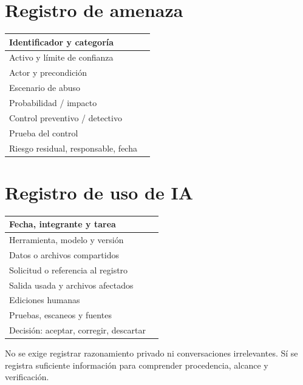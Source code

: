 \section{Registro de amenaza}

\begin{center}
\begin{tabularx}{0.94\textwidth}{p{3.3cm}X}
\toprule
Identificador y categoría & \\[0.45cm]\midrule
Activo y límite de confianza & \\[0.45cm]\midrule
Actor y precondición & \\[0.45cm]\midrule
Escenario de abuso & \\[0.45cm]\midrule
Probabilidad / impacto & \\[0.45cm]\midrule
Control preventivo / detectivo & \\[0.45cm]\midrule
Prueba del control & \\[0.45cm]\midrule
Riesgo residual, responsable, fecha & \\[0.45cm]
\bottomrule
\end{tabularx}
\end{center}

\section{Registro de uso de IA}

\begin{center}
\begin{tabularx}{0.94\textwidth}{p{3.3cm}X}
\toprule
Fecha, integrante y tarea & \\[0.45cm]\midrule
Herramienta, modelo y versión & \\[0.45cm]\midrule
Datos o archivos compartidos & \\[0.45cm]\midrule
Solicitud o referencia al registro & \\[0.45cm]\midrule
Salida usada y archivos afectados & \\[0.45cm]\midrule
Ediciones humanas & \\[0.45cm]\midrule
Pruebas, escaneos y fuentes & \\[0.45cm]\midrule
Decisión: aceptar, corregir, descartar & \\[0.45cm]
\bottomrule
\end{tabularx}
\end{center}

No se exige registrar razonamiento privado ni conversaciones irrelevantes. Sí se registra suficiente información para comprender procedencia, alcance y verificación.

